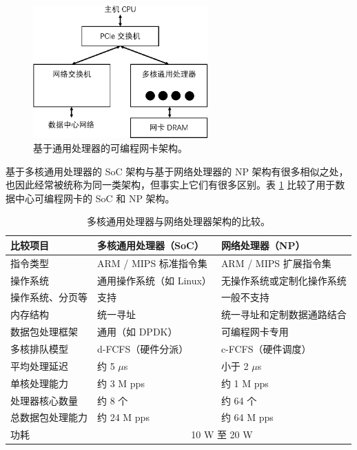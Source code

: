 \begin{figure}[htbp]
	\centering
	\includegraphics[width=0.6\textwidth]{figures/smartnic_soc.pdf}
	\caption{基于通用处理器的可编程网卡架构。}
	\label{background:fig:smartnic_soc}
\end{figure}

基于多核通用处理器的 SoC 架构与基于网络处理器的 NP 架构有很多相似之处，也因此经常被统称为同一类架构，但事实上它们有很多区别。表 \ref{background:tab:soc-vs-np} 比较了用于数据中心可编程网卡的 SoC 和 NP 架构。

\begin{table}[htbp]
	\begin{tabular}{l|p{}|p{}}
		\hline
		比较项目 & 多核通用处理器（SoC） & 网络处理器（NP） \\
		\hline
		\hline
		指令类型 & ARM / MIPS 标准指令集 & ARM / MIPS 扩展指令集 \\
		\hline
		操作系统 & 通用操作系统（如 Linux） & 无操作系统或定制化操作系统 \\
		\hline
		操作系统、分页等 & 支持 & 一般不支持 \\
		\hline
		内存结构 & 统一寻址 & 统一寻址和定制数据通路结合 \\
		\hline
		数据包处理框架 & 通用（如 DPDK） & 可编程网卡专用 \\
		\hline
		多核排队模型 & d-FCFS（硬件分派） & c-FCFS（硬件调度） \\
		\hline
		平均处理延迟 & 约 5 $\mu$s & 小于 2 $\mu$s \\
		\hline
		单核处理能力 & 约 3 M pps & 约 1 M pps \\
		\hline
		处理器核心数量 & 约 8 个 & 约 64 个 \\
		\hline
		总数据包处理能力 & 约 24 M pps & 约 64 M pps \\
		\hline
		功耗 & \multicolumn{2}{c}{10 W 至 20 W} \\ 
		\hline
	\end{tabular}
	\caption{多核通用处理器与网络处理器架构的比较。}
	\label{background:tab:soc-vs-np}
\end{table}


